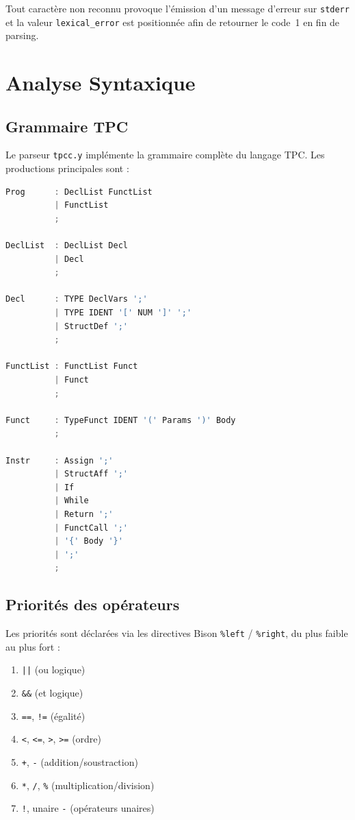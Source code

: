 \documentclass[12pt,a4paper]{article}
\begin{document}
Tout caractère non reconnu provoque l'émission d'un message d'erreur sur
\texttt{stderr} et la valeur \texttt{lexical\_error} est positionnée afin de
retourner le code~1 en fin de parsing.

\section{Analyse Syntaxique}

\subsection{Grammaire TPC}

Le parseur \texttt{tpcc.y} implémente la grammaire complète du langage TPC.
Les productions principales sont :

\begin{lstlisting}[language=C, caption={Extrait de la grammaire Bison}]
Prog      : DeclList FunctList
          | FunctList
          ;

DeclList  : DeclList Decl
          | Decl
          ;

Decl      : TYPE DeclVars ';'
          | TYPE IDENT '[' NUM ']' ';'
          | StructDef ';'
          ;

FunctList : FunctList Funct
          | Funct
          ;

Funct     : TypeFunct IDENT '(' Params ')' Body
          ;

Instr     : Assign ';'
          | StructAff ';'
          | If
          | While
          | Return ';'
          | FunctCall ';'
          | '{' Body '}'
          | ';'
          ;
\end{lstlisting}

\subsection{Priorités des opérateurs}

Les priorités sont déclarées via les directives Bison \texttt{\%left} /
\texttt{\%right}, du plus faible au plus fort :

\begin{enumerate}
  \item \texttt{||} (ou logique)
  \item \texttt{\&\&} (et logique)
  \item \texttt{==}, \texttt{!=} (égalité)
  \item \texttt{<}, \texttt{<=}, \texttt{>}, \texttt{>=} (ordre)
  \item \texttt{+}, \texttt{-} (addition/soustraction)
  \item \texttt{*}, \texttt{/}, \texttt{\%} (multiplication/division)
  \item \texttt{!}, unaire \texttt{-} (opérateurs unaires)
\end{enumerate}
\end{document}
